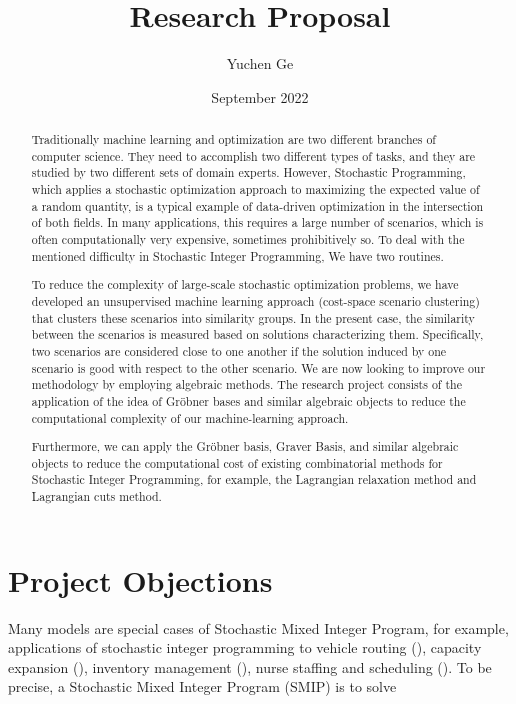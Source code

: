 \documentclass{article}
\title{Research Proposal}
\author{Yuchen Ge}
\date{September 2022}
\theoremstyle{plain}
\theoremstyle{definition}
\begin{document}
\maketitle
\tableofcontents
\newpage

\begin{abstract}
Traditionally machine learning and optimization are two different branches of computer science. They need to accomplish two different types of tasks, and they are studied by two different sets of domain experts. However, Stochastic Programming,  which applies a stochastic optimization approach to maximizing the expected value of a random quantity, is a typical example of data-driven optimization in the intersection of both fields. In many applications, this requires a large number of scenarios, which is often computationally very expensive, sometimes prohibitively so. To deal with the mentioned difficulty in Stochastic Integer Programming, We have two routines. 

To reduce the complexity of large-scale stochastic optimization problems, we have developed an unsupervised machine learning approach (cost-space scenario clustering) that clusters these scenarios into similarity groups. In the present case, the similarity between the scenarios is measured based on solutions characterizing them. Specifically, two scenarios are considered close to one another if the solution induced by one scenario is good with respect to the other scenario. We are now looking to improve our methodology by employing algebraic methods. The research project consists of the application of the idea of Gröbner bases and similar algebraic objects to reduce the computational complexity of our machine-learning approach. 

Furthermore, we can apply the Gröbner basis, Graver Basis, and similar algebraic objects to reduce the computational cost of existing combinatorial methods for Stochastic Integer Programming, for example, the Lagrangian relaxation method and Lagrangian cuts method.  
\end{abstract}
\section{Project Objections}
Many models are special cases of Stochastic Mixed Integer Program, for example, applications of stochastic integer programming to vehicle routing (\cite{Laporte et al. 2002}), capacity expansion (\cite{Ahmed and Sahinidis 2003}), inventory management (\cite{Gunpinar and Centeno 2015}), nurse staffing and scheduling (\cite{Kim and Mehrotra 2015}). To be precise, a Stochastic Mixed Integer Program (SMIP) is to solve 
\end{document}
